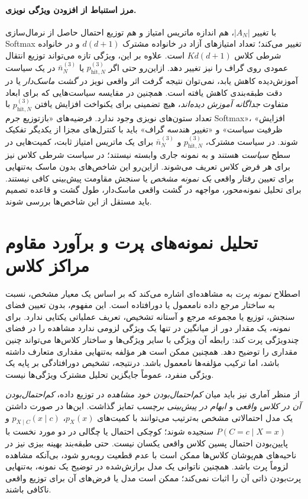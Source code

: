 \paragraph{مرز استنباط از افزودن ویژگی نویزی.}
با تغییر $|A_N|$، هم اندازه ماتریس امتیاز
و هم توزیع احتمال حاصل از نرمال‌سازی Softmax تغییر می‌کند؛
تعداد امتیازهای آزاد در خانواده مشترک $d(d+1)$
و در خانواده شرطی کلاس $Kd(d+1)$ است.
علاوه بر این، ویژگی تازه می‌تواند توزیع انتقال عمودی
روی گراف را نیز تغییر دهد. ازاین‌رو حتی اگر
$p_{\mathrm{hit},N}^{(3)}$ یا
$\bar n_N^{(3)}$ در یک سیاست آموزش‌دیده کاهش یابد،
نمی‌توان نتیجه گرفت اثر واقعی نویز در
\emph{گشت ماسک‌دار} یا در دقت طبقه‌بندی کاهش یافته است.
همچنین در مقایسه سیاست‌هایی که برای ابعاد متفاوت
\emph{جداگانه آموزش دیده‌اند}،
هیچ تضمینی برای یکنواخت افزایش یافتن
$p_{\mathrm{hit},N}^{(3)}$
با تعداد ستون‌های نویزی وجود ندارد.
فرضیه‌های «بازتوزیع جرم Softmax»، «افزایش ظرفیت سیاست»
و «تغییر هندسه گراف» باید با کنترل‌های مجزا
از یکدیگر تفکیک شوند.
در سیاست مشترک، $p_{\mathrm{hit},N}^{(3)}$ و
$\bar n_N^{(3)}$ برای یک ماتریس
امتیاز ثابت، کمیت‌هایی در سطح \emph{سیاست} هستند
و به نمونه جاری وابسته نیستند؛ در سیاست شرطی کلاس
نیز برای هر فرض کلاس تعریف می‌شوند.
ازاین‌رو این شاخص‌های بدون ماسک به‌تنهایی
برای تعیین رفتار واقعی \emph{یک نمونه مشخص}
یا سنجش مقاومت پیش‌بینی کافی نیستند.
برای تحلیل نمونه‌محور،
مواجهه در گشت واقعی ماسک‌دار،
طول گشت و قاعده تصمیم
باید مستقل از این شاخص‌ها بررسی شوند.

\section{تحلیل نمونه‌های پرت و برآورد مقاوم مراکز کلاس}
\label{sec:ch3-outliers}
اصطلاح \emph{نمونه پرت} به مشاهده‌ای
اشاره می‌کند که بر اساس یک معیار مشخص،
نسبت به ساختار مرجع داده نامعمول
یا دورافتاده است. این مفهوم، بدون
تعیین فضای سنجش، توزیع یا مجموعه
مرجع و آستانه تشخیص، تعریف عملیاتی
یکتایی ندارد. برای نمونه، یک مقدار
دور از میانگین در تنها یک ویژگی
لزومی ندارد مشاهده را در فضای
چندویژگی پرت کند: رابطه آن ویژگی
با سایر ویژگی‌ها و ساختار کلاس‌ها
می‌تواند چنین مقداری را توضیح دهد.
همچنین ممکن است هر مؤلفه به‌تنهایی
مقداری متعارف داشته باشد، اما
ترکیب مؤلفه‌ها نامعمول باشد.
درنتیجه، تشخیص دورافتادگی
بر پایه یک ویژگی منفرد، عموماً
جایگزین تحلیل مشترک ویژگی‌ها نیست.

از منظر آماری نیز باید میان
\emph{کم‌احتمال‌بودن خود مشاهده}
در توزیع داده، \emph{کم‌احتمال‌بودن
آن در کلاس واقعی} و
\emph{ابهام در پیش‌بینی برچسب}
تمایز گذاشت. این‌ها در صورت
داشتن یک مدل احتمالاتی مشخص
به‌ترتیب می‌توانند با کمیت‌های
$p_X(x)$، $p_{X\mid C}(x\mid c)$
و $P(C=c\mid X=x)$ سنجیده شوند؛
کوچکی احتمال یا چگالی در دو
مورد نخست با پایین‌بودن احتمال
پسین کلاس واقعی یکسان نیست.
حتی طبقه‌بند بهینه بیزی نیز
در ناحیه‌های هم‌پوشان کلاس‌ها
ممکن است با عدم قطعیت روبه‌رو شود،
بی‌آنکه مشاهده لزوماً پرت باشد.
همچنین ناتوانی یک مدل برازش‌شده
در توضیح یک نمونه، به‌تنهایی
پرت‌بودن ذاتی آن را اثبات نمی‌کند؛
ممکن است مدل یا فرض‌های آن
برای توزیع واقعی ناکافی باشند.

